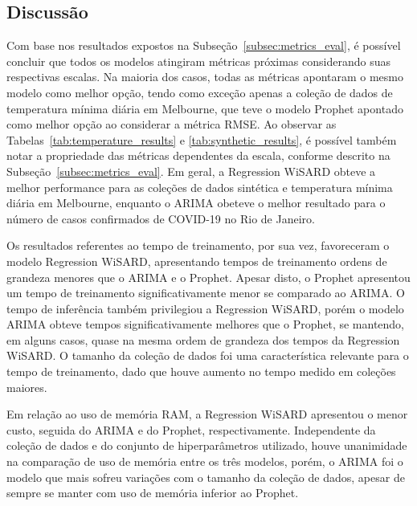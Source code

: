 \FloatBarrier

\subsection{Discussão}
Com base nos resultados expostos na Subseção~\ref{subsec:metrics_eval}, é possível concluir que todos os modelos atingiram métricas próximas considerando suas respectivas escalas. Na maioria dos casos, todas as métricas apontaram o mesmo modelo como melhor opção, tendo como exceção apenas a coleção de dados de temperatura mínima diária em Melbourne, que teve o modelo Prophet apontado como melhor opção ao considerar a métrica RMSE. Ao observar as Tabelas~\ref{tab:temperature_results} e \ref{tab:synthetic_results}, é possível também notar a propriedade das métricas dependentes da escala, conforme descrito na Subseção~\ref{subsec:metrics_eval}. Em geral, a Regression WiSARD obteve a melhor performance para as coleções de dados sintética e temperatura mínima diária em Melbourne, enquanto o ARIMA obeteve o melhor resultado para o número de casos confirmados de COVID-19 no Rio de Janeiro.

Os resultados referentes ao tempo de treinamento, por sua vez, favoreceram o modelo Regression WiSARD, apresentando tempos de treinamento ordens de grandeza menores que o ARIMA e o Prophet. Apesar disto, o Prophet apresentou um tempo de treinamento significativamente menor se comparado ao ARIMA. O tempo de inferência também privilegiou a Regression WiSARD, porém o modelo ARIMA obteve tempos significativamente melhores que o Prophet, se mantendo, em alguns casos, quase na mesma ordem de grandeza dos tempos da Regression WiSARD. O tamanho da coleção de dados foi uma característica relevante para o tempo de treinamento, dado que houve aumento no tempo medido em coleções maiores.

Em relação ao uso de memória RAM, a Regression WiSARD apresentou o menor custo, seguida do ARIMA e do Prophet, respectivamente. Independente da coleção de dados e do conjunto de hiperparâmetros utilizado, houve unanimidade na comparação de uso de memória entre os três modelos, porém, o ARIMA foi o modelo que mais sofreu variações com o tamanho da coleção de dados, apesar de sempre se manter com uso de memória inferior ao Prophet.